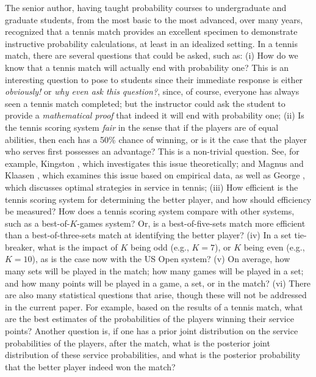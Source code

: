 \documentclass[11pt]{article}
\theoremstyle{plain}
\theoremstyle{definition}
\begin{document}
The senior author, having taught probability courses to undergraduate and graduate students, from the most basic to the most advanced, over many years, recognized that a tennis match provides an excellent specimen to demonstrate instructive probability calculations, at least in an idealized setting. In a tennis match, there are several questions that could be asked, such as:
%
(i) How do we know that a tennis match will actually end with probability one? This is an interesting question to pose to students since their immediate response is either {\em obviously!} or {\em why even ask this question?}, since, of course, everyone has always seen a tennis match completed; but the instructor could ask the student to provide a {\em mathematical proof} that indeed it will end with probability one;
(ii) Is the tennis scoring system {\em fair} in the sense that if the players are of equal abilities, then each has a 50\% chance of winning, or is it the case that the player who serves first possesses an advantage? This is a non-trivial question. See, for example, Kingston \cite{Kingston1976}, which investigates this issue theoretically; and Magnus and Klaasen \cite{Magnus_Klaasen_1999}, which examines this issue based on empirical data, as well as George \cite{George1973}, which discusses optimal strategies in service in tennis;
(iii) How efficient is the tennis scoring system for determining the better player, and how should efficiency be measured? How does a tennis scoring system compare with other systems, such as a best-of-$K$-games system? Or, is a best-of-five-sets match more efficient than a best-of-three-sets match at identifying the better player? 
(iv) In a set tie-breaker, what is the impact of $K$ being odd (e.g., $K=7$), or $K$ being even (e.g., $K=10$), as is the case now with the US Open system?
(v) On average, how many sets will be played in the match; how many games will be played in a set; and how many points will be played in a game, a set, or in the match?
(vi) There are also many statistical questions that arise, though these will not be addressed in the current paper. For example, based on the results of a tennis match, what are the best estimates of the probabilities of the players winning their service points? Another question is, if one has a prior joint distribution on the service probabilities of the players, after the match, what is the posterior joint distribution of these service probabilities, and what is the posterior probability that the better player indeed won the match?
%
\end{document}
